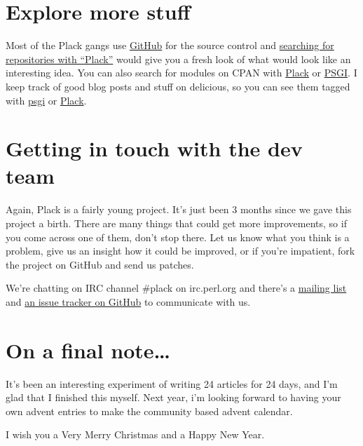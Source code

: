 \section{Explore more stuff}\label{explore-more-stuff}

Most of the Plack gangs use \href{http://github.com/}{GitHub} for the
source control and
\href{http://github.com/search?langOverride=\&q=plack\&repo=\&start_value=1\&type=Repositories}{searching
for repositories with ``Plack''} would give you a fresh look of what
would look like an interesting idea. You can also search for modules on
CPAN with
\href{http://search.cpan.org/search?query=plack\&mode=module}{Plack} or
\href{http://search.cpan.org/search?query=psgi\&mode=module}{PSGI}. I
keep track of good blog posts and stuff on delicious, so you can see
them tagged with \href{http://delicious.com/miyagawa/psgi}{psgi} or
\href{http://delicious.com/miyagawa/plack}{Plack}.

\section{Getting in touch with the dev
team}\label{getting-in-touch-with-the-dev-team}

Again, Plack is a fairly young project. It's just been 3 months since we
gave this project a birth. There are many things that could get more
improvements, so if you come across one of them, don't stop there. Let
us know what you think is a problem, give us an insight how it could be
improved, or if you're impatient, fork the project on GitHub and send us
patches.

We're chatting on IRC channel \#plack on irc.perl.org and there's a
\href{http://groups.google.com/group/psgi-plack}{mailing list} and
\href{http://github.com/plack/Plack/issues}{an issue tracker on GitHub}
to communicate with us.

\section{On a final note\ldots{}}\label{on-a-final-note}

It's been an interesting experiment of writing 24 articles for 24 days,
and I'm glad that I finished this myself. Next year, i'm looking forward
to having your own advent entries to make the community based advent
calendar.

I wish you a Very Merry Christmas and a Happy New Year.
